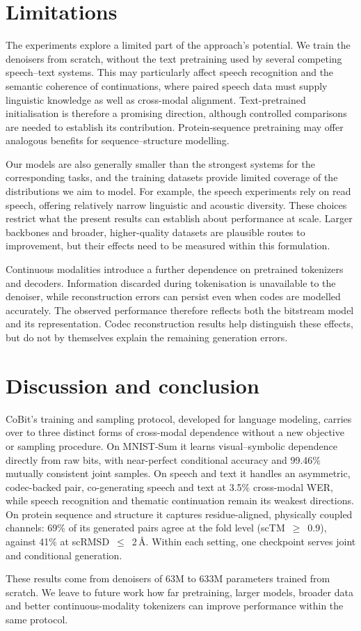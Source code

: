 \section{Limitations}
\label{sec:limitations}

The experiments explore a limited part of the approach's potential. We train the denoisers from
scratch, without the text pretraining used by several competing speech--text systems. This may
particularly affect speech recognition and the semantic coherence of continuations, where paired
speech data must supply linguistic knowledge as well as cross-modal alignment. Text-pretrained
initialisation is therefore a promising direction, although controlled comparisons are needed to
establish its contribution. Protein-sequence pretraining may offer analogous benefits for
sequence--structure modelling.

Our models are also generally smaller than the strongest systems for the corresponding tasks,
and the training datasets provide limited coverage of the distributions we aim to model. For
example, the speech experiments rely on read speech, offering relatively narrow linguistic and
acoustic diversity. These choices restrict what the present results can establish about
performance at scale. Larger backbones and broader, higher-quality datasets are plausible routes
to improvement, but their effects need to be measured within this formulation.

Continuous modalities introduce a further dependence on pretrained tokenizers and decoders.
Information discarded during tokenisation is unavailable to the denoiser, while reconstruction
errors can persist even when codes are modelled accurately. The observed performance therefore
reflects both the bitstream model and its representation. Codec reconstruction results help
distinguish these effects, but do not by themselves explain the remaining generation errors.

\section{Discussion and conclusion}
\label{sec:discussion}
\label{sec:conclusion}

CoBit's training and sampling protocol, developed for language modeling, carries over to three
distinct forms of cross-modal dependence without a new objective or sampling procedure. On
MNIST-Sum it learns visual--symbolic dependence directly from raw bits, with near-perfect
conditional accuracy and 99.46\% mutually consistent joint samples. On speech and text it handles
an asymmetric, codec-backed pair, co-generating speech and text at 3.5\% cross-modal WER, while
speech recognition and thematic continuation remain its weakest directions. On protein sequence and
structure it captures residue-aligned, physically coupled channels: 69\% of its generated pairs
agree at the fold level (scTM~$\geq$~0.9), against 41\% at scRMSD~$\leq$~2\,\AA. Within each
setting, one checkpoint serves joint and conditional generation.

These results come from denoisers of 63M to 633M parameters trained from scratch. We leave to future work how far pretraining, larger models, broader data and better continuous-modality tokenizers can improve performance within the same protocol.
